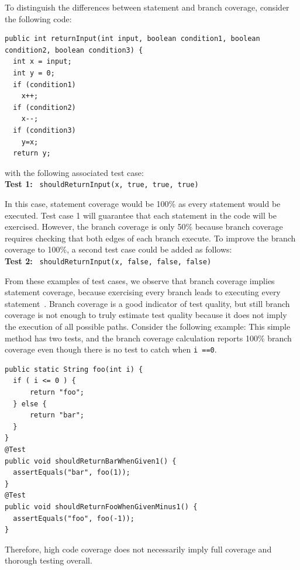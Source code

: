 \documentclass[conference]{IEEEtran}
\begin{document}
To distinguish the differences between statement and branch coverage, consider the following code:
\begin{lstlisting}
public int returnInput(int input, boolean condition1, boolean condition2, boolean condition3) {
  int x = input;
  int y = 0;
  if (condition1) 
    x++;
  if (condition2) 
    x--;
  if (condition3) 
    y=x;
  return y;
\end{lstlisting}
with the following associated test case:\\
\textbf{Test 1:} \texttt{\small 
shouldReturnInput(x, true, true, true)}


In this case, statement coverage would be 100\% as every statement would be executed.  Test case 1 will guarantee that each statement in the code will be exercised. However, the branch coverage is only 50\% because branch coverage requires checking that both edges of each branch execute.  To improve the branch coverage to 100\%, a second test case could be added as follows:\\ 
\textbf{Test 2:} \texttt{\small 
shouldReturnInput(x, false, false, false)}

From these examples of test cases, we observe that branch coverage implies statement coverage, because exercising every branch leads to executing every statement~\cite{steve2011Code}. Branch coverage is a good indicator of test quality, but still branch coverage is not enough to truly estimate test quality because it does not imply the execution of all possible paths. Consider the following example: This simple method has two tests, and the branch coverage calculation reports 100\% branch coverage even though there is no test to catch when \texttt{i ==0}.\\
\begin{lstlisting}
public static String foo(int i) {
  if ( i <= 0 ) {
      return "foo"; 
  } else {
      return "bar";
  }
}
@Test
public void shouldReturnBarWhenGiven1() {
  assertEquals("bar", foo(1));
}
@Test
public void shouldReturnFooWhenGivenMinus1() {
  assertEquals("foo", foo(-1));
}
\end{lstlisting}
Therefore, high code coverage does not necessarily imply full coverage and thorough testing overall. 
\end{document}
